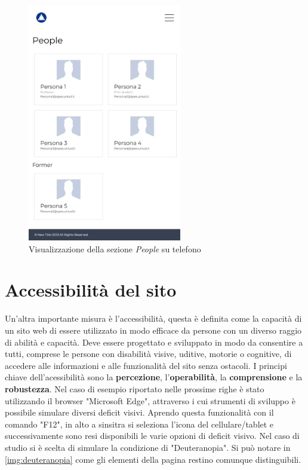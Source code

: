 \documentclass[target=bach,aauheader=]{thud}
\begin{document}
\begin{figure}
    \centering
    \includegraphics[width = 0.6\textwidth]{images/people-tablet.png}
    \caption{Visualizzazione della sezione \textit{People} su telefono}
    \label{img:computertab}
\end{figure}

\section{Accessibilità del sito}
Un'altra importante misura è l'accessibilità, questa è definita come la capacità di un sito web di essere utilizzato in modo efficace da persone con un diverso raggio di abilità e capacità.
Deve essere progettato e sviluppato in modo da consentire a tutti, comprese le persone con disabilità visive, uditive, motorie o cognitive, di accedere alle informazioni e alle funzionalità del sito senza ostacoli.
\newline
I principi chiave dell'acessibilità sono la \textbf{percezione}, l'\textbf{operabilità}, la \textbf{comprensione} e la \textbf{robustezza}.
\newline \newline
Nel caso di esempio riportato nelle prossime righe è stato utilizzando il browser "Microsoft Edge", attraverso i cui strumenti di sviluppo è possibile simulare diversi deficit visivi.  
Aprendo questa funzionalità con il comando "F12", in alto a sinsitra si seleziona l'icona del cellulare/tablet e successivamente sono resi disponibili le varie opzioni di deficit visivo. 
Nel caso di studio si è scelta di simulare la condizione di "Deuteranopia". 
Si può notare in \cref{img:deuteranopia} come gli elementi della pagina restino comunque distinguibili.  
\end{document}
